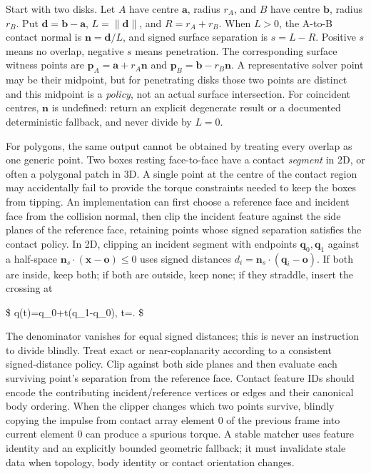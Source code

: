 Start with two disks. Let \(A\) have centre \(\mathbf a\), radius \(r_A\), and \(B\) have centre \(\mathbf b\), radius \(r_B\). Put \(\mathbf d=\mathbf b-\mathbf a\), \(L=\|\mathbf d\|\), and \(R=r_A+r_B\). When \(L>0\), the A-to-B contact normal is \(\mathbf n=\mathbf d/L\), and signed surface separation is \(s=L-R\). Positive \(s\) means no overlap, negative \(s\) means penetration. The corresponding surface witness points are \(\mathbf p_A=\mathbf a+r_A\mathbf n\) and \(\mathbf p_B=\mathbf b-r_B\mathbf n\). A representative solver point may be their midpoint, but for penetrating disks those two points are distinct and this midpoint is a \emph{policy}, not an actual surface intersection. For coincident centres, \(\mathbf n\) is undefined: return an explicit degenerate result or a documented deterministic fallback, and never divide by \(L=0\).

For polygons, the same output cannot be obtained by treating every overlap as one generic point. Two boxes resting face-to-face have a contact \emph{segment} in 2D, or often a polygonal patch in 3D. A single point at the centre of the contact region may accidentally fail to provide the torque constraints needed to keep the boxes from tipping. An implementation can first choose a reference face and incident face from the collision normal, then clip the incident feature against the side planes of the reference face, retaining points whose signed separation satisfies the contact policy. In 2D, clipping an incident segment with endpoints \(\mathbf q_0,\mathbf q_1\) against a half-space \(\mathbf n_s\cdot(\mathbf x-\mathbf o)\le0\) uses signed distances \(d_i=\mathbf n_s\cdot(\mathbf q_i-\mathbf o)\). If both are inside, keep both; if both are outside, keep none; if they straddle, insert the crossing at

\$ \mathbf q(t)=\mathbf q\_0+t(\mathbf q\_1-\mathbf q\_0), \qquad t=. \$

The denominator vanishes for equal signed distances; this is never an instruction to divide blindly. Treat exact or near-coplanarity according to a consistent signed-distance policy. Clip against both side planes and then evaluate each surviving point's separation from the reference face. Contact feature IDs should encode the contributing incident/reference vertices or edges and their canonical body ordering. When the clipper changes which two points survive, blindly copying the impulse from contact array element 0 of the previous frame into current element 0 can produce a spurious torque. A stable matcher uses feature identity and an explicitly bounded geometric fallback; it must invalidate stale data when topology, body identity or contact orientation changes.

